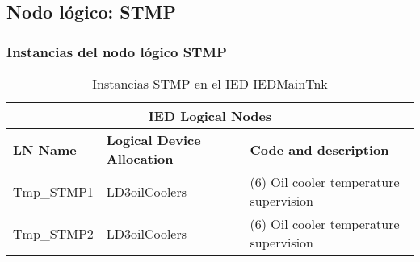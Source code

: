 
\subsection{Nodo l\'ogico: 			 STMP}

    \subsubsection{Instancias del nodo l\'ogico STMP}
    \begin{table}[H]
    \begin{center}
    \begin{tabular}{|l|l|p{6.8cm}|}
            \hline
            \multicolumn{3}{|c|}{\cellcolor[gray]{0.8} \textbf{IED Logical Nodes} } \\
            \hline
            \textbf{LN Name} & \textbf{Logical Device Allocation} & \textbf{Code and description} \\
            \hline
            Tmp\_STMP1 & LD3oilCoolers & (6) Oil cooler temperature supervision \\
            \hline
            Tmp\_STMP2 & LD3oilCoolers & (6) Oil cooler temperature supervision \\
            \hline
    \end{tabular}
    \caption{Instancias STMP en el IED IEDMainTnk}
    \label{table:lnInstSTMP6}
    \end{center}
    \end{table}
    
    
    
